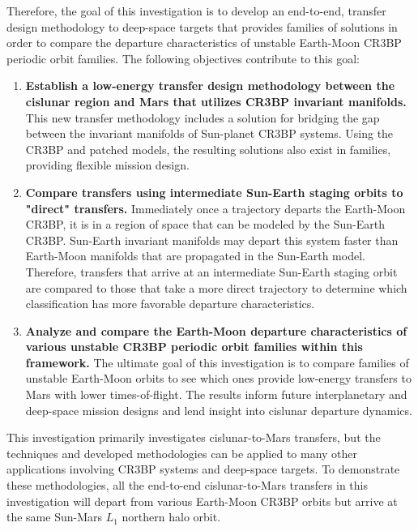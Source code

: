 Therefore, the goal of this investigation is to develop an end-to-end, transfer design
methodology to deep-space targets that provides families of solutions in order to compare the departure characteristics
of unstable Earth-Moon CR3BP periodic orbit families. The following objectives contribute to this
goal:
\begin{enumerate}
    \item   \textbf{Establish a low-energy transfer design methodology between the cislunar region and Mars that
            utilizes CR3BP invariant manifolds.} This new transfer methodology includes a
            solution for bridging the gap between the invariant manifolds of Sun-planet CR3BP
            systems. Using the CR3BP and patched models, the resulting solutions also exist in
            families, providing flexible mission design.
    \item   \textbf{Compare transfers using intermediate Sun-Earth staging orbits to "direct" transfers.}
            Immediately once a trajectory departs the Earth-Moon CR3BP, it is in a region of
            space that can be modeled by the Sun-Earth CR3BP. Sun-Earth invariant manifolds may
            depart this system faster than Earth-Moon manifolds that are propagated in the Sun-Earth
            model. Therefore, transfers that arrive at an intermediate Sun-Earth staging orbit are compared
            to those that take a more direct trajectory to determine which classification has more favorable departure characteristics.
    \item   \textbf{Analyze and compare the Earth-Moon departure characteristics of various
            unstable CR3BP periodic orbit families within this framework.} The ultimate goal of
            this investigation is to compare families of unstable Earth-Moon orbits to see which
            ones provide low-energy transfers to Mars with lower times-of-flight. The results inform
            future interplanetary and deep-space mission designs and lend insight into cislunar
            departure dynamics.

\end{enumerate}
This investigation primarily investigates cislunar-to-Mars transfers, but the techniques and developed
methodologies can be applied to many other applications involving CR3BP systems and deep-space
targets. To demonstrate these methodologies, all the end-to-end cislunar-to-Mars transfers in this investigation will depart
from various Earth-Moon CR3BP orbits but arrive at the same Sun-Mars $L_{1}$ northern halo orbit.

